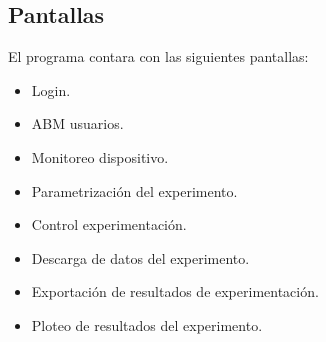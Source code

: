 \documentclass[12pt]{article}
\begin{document}
    \subsection{Pantallas}
      El programa contara con las siguientes pantallas:

    \begin{itemize}
      \item Login.      
      \item ABM usuarios.
      \item Monitoreo dispositivo.
      \item Parametrización del experimento.
      \item Control experimentación.
      \item Descarga de datos del experimento.
      \item Exportación de resultados de experimentación.
      \item Ploteo de resultados del experimento.
    \end{itemize}
  

% 
% 
    
\end{document}
